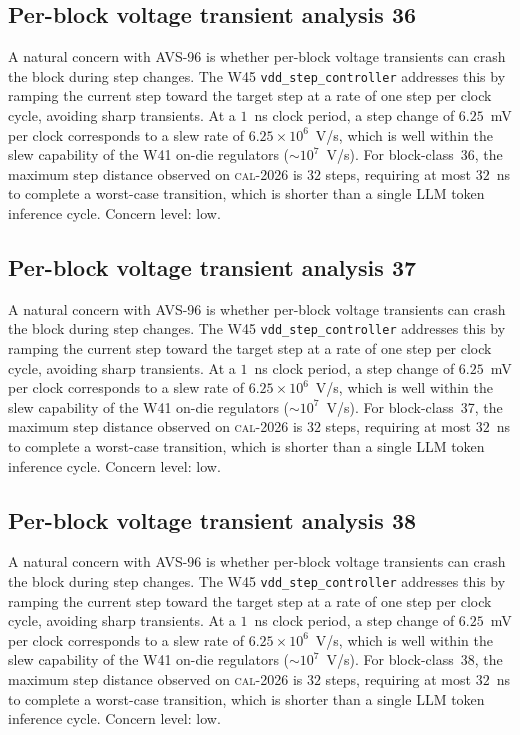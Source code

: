 \subsection{Per-block voltage transient analysis 36}

A natural concern with AVS-96 is whether per-block voltage transients
can crash the block during step changes. The W45 \texttt{vdd\_step\_controller} addresses this by ramping the current
step toward the target step at a rate of one step per clock cycle,
avoiding sharp transients. At a $1$~ns clock period, a step change of
$6.25$~mV per clock corresponds to a slew rate of $6.25\times 10^6$~V/s,
which is well within the slew capability of the W41 on-die regulators
($\sim 10^7$~V/s). For block-class~36, the maximum step distance
observed on \textsc{cal-2026} is $32$ steps, requiring at most $32$~ns
to complete a worst-case transition, which is shorter than a single
LLM token inference cycle. Concern level: low.


\subsection{Per-block voltage transient analysis 37}

A natural concern with AVS-96 is whether per-block voltage transients
can crash the block during step changes. The W45 \texttt{vdd\_step\_controller} addresses this by ramping the current
step toward the target step at a rate of one step per clock cycle,
avoiding sharp transients. At a $1$~ns clock period, a step change of
$6.25$~mV per clock corresponds to a slew rate of $6.25\times 10^6$~V/s,
which is well within the slew capability of the W41 on-die regulators
($\sim 10^7$~V/s). For block-class~37, the maximum step distance
observed on \textsc{cal-2026} is $32$ steps, requiring at most $32$~ns
to complete a worst-case transition, which is shorter than a single
LLM token inference cycle. Concern level: low.


\subsection{Per-block voltage transient analysis 38}

A natural concern with AVS-96 is whether per-block voltage transients
can crash the block during step changes. The W45 \texttt{vdd\_step\_controller} addresses this by ramping the current
step toward the target step at a rate of one step per clock cycle,
avoiding sharp transients. At a $1$~ns clock period, a step change of
$6.25$~mV per clock corresponds to a slew rate of $6.25\times 10^6$~V/s,
which is well within the slew capability of the W41 on-die regulators
($\sim 10^7$~V/s). For block-class~38, the maximum step distance
observed on \textsc{cal-2026} is $32$ steps, requiring at most $32$~ns
to complete a worst-case transition, which is shorter than a single
LLM token inference cycle. Concern level: low.


